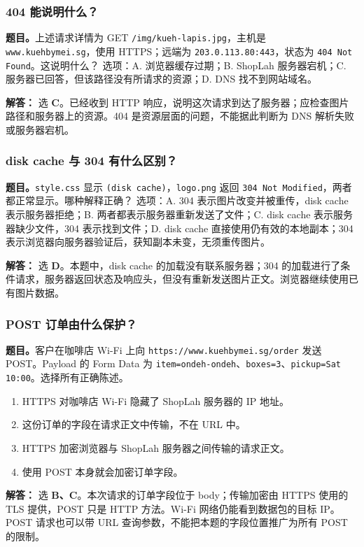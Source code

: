 \documentclass[11pt,a4paper,fontset=fandol]{ctexart}
\renewcommand{\exercisequestion}[2]{%
  \Needspace{5\baselineskip}%
  \subsubsection{#2}\label{exercise:#1}%
}
\renewenvironment{checkedsolution}
  {\par\nopagebreak[4]\textbf{解答：}\ignorespaces}
  {\par}
\begin{document}
\exercisequestion{SC2008-HW06-Q11}{404 能说明什么？}
\textbf{题目。}上述请求详情为 GET \texttt{/img/kueh-lapis.jpg}，主机是 \texttt{www.kuehbymei.sg}，使用 HTTPS；远端为 \texttt{203.0.113.80:443}，状态为 \texttt{404 Not Found}。这说明什么？
选项：A. 浏览器缓存过期；B. ShopLah 服务器宕机；C. 服务器已回答，但该路径没有所请求的资源；D. DNS 找不到网站域名。
\begin{checkedsolution}
选 \textbf{C}。已经收到 HTTP 响应，说明这次请求到达了服务器；应检查图片路径和服务器上的资源。404 是资源层面的问题，不能据此判断为 DNS 解析失败或服务器宕机。
\end{checkedsolution}

\exercisequestion{SC2008-HW06-Q12}{disk cache 与 304 有什么区别？}
\textbf{题目。}\texttt{style.css} 显示 \texttt{(disk cache)}，\texttt{logo.png} 返回 \texttt{304 Not Modified}，两者都正常显示。哪种解释正确？
选项：A. 304 表示图片改变并被重传，disk cache 表示服务器拒绝；B. 两者都表示服务器重新发送了文件；C. disk cache 表示服务器缺少文件，304 表示找到文件；D. disk cache 直接使用仍有效的本地副本；304 表示浏览器向服务器验证后，获知副本未变，无须重传图片。
\begin{checkedsolution}
选 \textbf{D}。本题中，disk cache 的加载没有联系服务器；304 的加载进行了条件请求，服务器返回状态及响应头，但没有重新发送图片正文。浏览器继续使用已有图片数据。
\end{checkedsolution}

\exercisequestion{SC2008-HW06-Q13}{POST 订单由什么保护？}
\textbf{题目。}客户在咖啡店 Wi-Fi 上向 \texttt{https://www.kuehbymei.sg/order} 发送 POST。Payload 的 Form Data 为 \texttt{item=ondeh-ondeh}、\texttt{boxes=3}、\texttt{pickup=Sat 10:00}。选择所有正确陈述。
\begin{enumerate}[label=\Alph*.]
  \item HTTPS 对咖啡店 Wi-Fi 隐藏了 ShopLah 服务器的 IP 地址。
  \item 这份订单的字段在请求正文中传输，不在 URL 中。
  \item HTTPS 加密浏览器与 ShopLah 服务器之间传输的请求正文。
  \item 使用 POST 本身就会加密订单字段。
\end{enumerate}
\begin{checkedsolution}
选 \textbf{B、C}。本次请求的订单字段位于 body；传输加密由 HTTPS 使用的 TLS 提供，POST 只是 HTTP 方法。Wi-Fi 网络仍能看到数据包的目标 IP。POST 请求也可以带 URL 查询参数，不能把本题的字段位置推广为所有 POST 的限制。
\end{checkedsolution}
\end{document}

